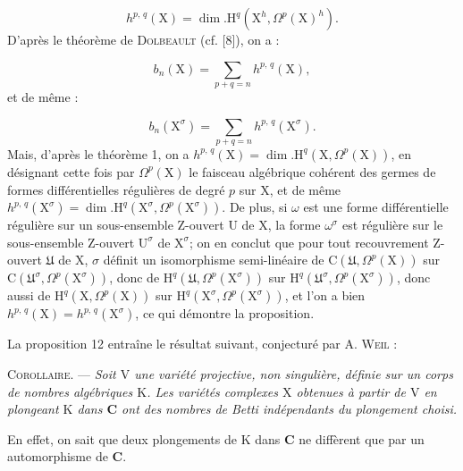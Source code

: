 \begin{equation*}
h^{p,\,q}(\mathrm{X}) = \dim. \mathrm{H}^q(\mathrm{X}^h, \Omega^p(\mathrm{X})^h).
\end{equation*}
D'après le théorème de \textsc{Dolbeault} (cf. [8]), on a :

\begin{equation*}
b_n(\mathrm{X}) = \sum_{p + q = n} h^{p,\,q}(\mathrm{X}),
\end{equation*}
et de même :

\begin{equation*}
b_n(\mathrm{X}^\sigma) = \sum_{p + q = n} h^{p,\,q}(\mathrm{X}^\sigma).
\end{equation*}
Mais, d'après le théorème 1, on a $h^{p,\,q}(\mathrm{X}) = \dim. \mathrm{H}^q(\mathrm{X}, \Omega^p(\mathrm{X}))$, en désignant cette fois par $\Omega^p(\mathrm{X})$ le faisceau algébrique cohérent des germes de formes différentielles régulières de degré $p$ sur $\mathrm{X}$, et de même $h^{p,\,q}(\mathrm{X}^\sigma) = \dim. \mathrm{H}^q(\mathrm{X}^\sigma, \Omega^p(\mathrm{X}^\sigma))$. De plus, si $\omega$ est une forme différentielle régulière sur un sous-ensemble Z-ouvert $\mathrm{U}$ de $\mathrm{X}$, la forme $\omega^\sigma$ est régulière sur le sous-ensemble Z-ouvert $\mathrm{U}^\sigma$ de $\mathrm{X}^\sigma$; on en conclut que pour tout recouvrement Z-ouvert $\mathfrak{U}$ de $\mathrm{X}$, $\sigma$ définit un isomorphisme semi-linéaire de $\mathrm{C}(\mathfrak{U}, \Omega^p(\mathrm{X}))$ sur $\mathrm{C}(\mathfrak{U}^\sigma, \Omega^p(\mathrm{X}^\sigma))$, donc de $\mathrm{H}^q(\mathfrak{U}, \Omega^p(\mathrm{X}^\sigma))$ sur $\mathrm{H}^q(\mathfrak{U}^\sigma, \Omega^p(\mathrm{X}^\sigma))$, donc aussi de $\mathrm{H}^q(\mathrm{X}, \Omega^p(\mathrm{X}))$ sur $\mathrm{H}^q(\mathrm{X}^\sigma, \Omega^p(\mathrm{X}^\sigma))$, et l'on a bien $h^{p,\,q}(\mathrm{X}) = h^{p,\,q}(\mathrm{X}^\sigma)$, ce qui démontre la proposition.

La proposition 12 entraîne le résultat suivant, conjecturé par A. \textsc{Weil} :

\textsc{Corollaire}. --- \textit{Soit $\mathrm{V}$ une variété projective, non singulière, définie sur un corps de nombres algébriques $\mathrm{K}$. Les variétés complexes $\mathrm{X}$ obtenues à partir de $\mathrm{V}$ en plongeant $\mathrm{K}$ dans $\mathbf{C}$ ont des nombres de Betti indépendants du plongement choisi.}

En effet, on sait que deux plongements de $\mathrm{K}$ dans $\mathbf{C}$ ne diffèrent que par un automorphisme de $\mathbf{C}$.


